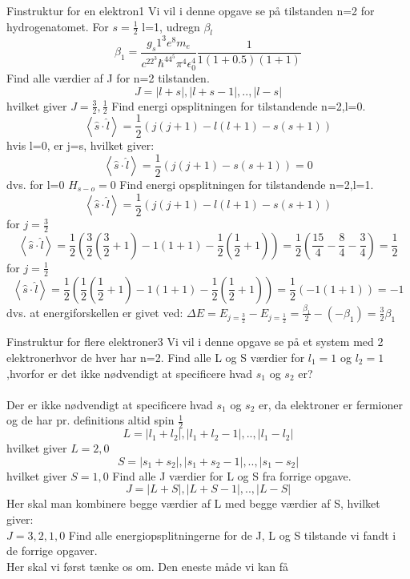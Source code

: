 \begin{opgave}{Finstruktur for en elektron}{1}
Vi vil i denne opgave se på tilstanden n=2 for hydrogenatomet.
\opg For $s=\frac{1}{2}$ l=1, udregn $\beta_l$
$$\beta_1=\frac{g_s1^3e^8m_e}{c^22^3\hbar^44^5\pi^4\epsilon_0^4}\frac{1}{1(1+0.5)(1+1)}$$
\opg Find alle værdier af J for n=2 tilstanden.
$$J=|l+s|,|l+s-1|,..,|l-s|$$
hvilket giver $J=\frac{3}{2},\frac{1}{2}$
\opg Find energi opsplitningen for tilstandende n=2,l=0.
$$\left<\hat{s}\cdot\hat{l}\right>=\frac{1}{2}(j(j+1)-l(l+1)-s(s+1))$$
hvis l=0, er j=s, hvilket giver:
$$\left<\hat{s}\cdot\hat{l}\right>=\frac{1}{2}(j(j+1)-s(s+1))=0$$
dvs. for l=0 $H_{s-o}=0$
\opg Find energi opsplitningen for tilstandende n=2,l=1.
$$\left<\hat{s}\cdot\hat{l}\right>=\frac{1}{2}(j(j+1)-l(l+1)-s(s+1))$$
for $j=\frac{3}{2}$
$$\left<\hat{s}\cdot\hat{l}\right>=\frac{1}{2}(\frac{3}{2}(\frac{3}{2}+1)-1(1+1)-\frac{1}{2}(\frac{1}{2}+1))=\frac{1}{2}(\frac{15}{4}-\frac{8}{4}-\frac{3}{4})=\frac{1}{2}$$
for $j=\frac{1}{2}$
$$\left<\hat{s}\cdot\hat{l}\right>=\frac{1}{2}(\frac{1}{2}(\frac{1}{2}+1)-1(1+1)-\frac{1}{2}(\frac{1}{2}+1))=\frac{1}{2}(-1(1+1))=-1$$
dvs. at energiforskellen er givet ved:
$\Delta E=E_{j=\frac{3}{2}}-E_{j=\frac{1}{2}}=\frac{\beta_1}{2}-(-\beta_1)=\frac{3}{2}\beta_1$
\end{opgave}
\begin{opgave}{Finstruktur for flere elektroner}{3}
Vi vil i denne opgave se på et system med 2 elektronerhvor de hver har n=2.
\opg Find alle L og S værdier for $l_1=1$ og $l_2=1$,hvorfor er det ikke nødvendigt at specificere hvad $s_1$ og $s_2$ er?\\
\\
Der er ikke nødvendigt at specificere hvad $s_1$ og $s_2$ er, da elektroner er fermioner og de har pr. definitions altid spin $\frac{1}{2}$
$$L=|l_1+l_2|,|l_1+l_2-1|,..,|l_1-l_2|$$
hvilket giver $L=2,0$
$$S=|s_1+s_2|,|s_1+s_2-1|,..,|s_1-s_2|$$
hvilket giver $S=1,0$
\opg Find alle J værdier for L og S fra forrige opgave.
$$J=|L+S|,|L+S-1|,..,|L-S|$$
Her skal man kombinere begge værdier af L med begge værdier af S, hvilket giver:\\
$J=3,2,1,0$
\opg Find alle energiopsplitningerne for de J, L og S tilstande vi fandt i de forrige opgaver.\\
Her skal vi først tænke os om. Den eneste måde vi kan få
\end{opgave}